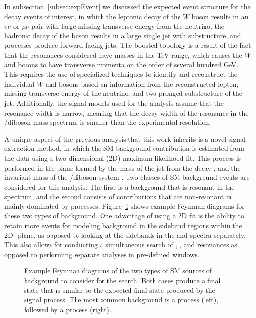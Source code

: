 In subsection~\ref{subsec:expEvent} we discussed the expected event structure for the decay events of interest, in which the leptonic decay of the $W$ boson results in an $e\nu$ or $\mu\nu$ pair with large missing transverse energy from the neutrino, the hadronic decay of the \VorH boson results in a large single jet with substructure, and \VBF processes produce forward-facing jets.
The boosted topology is a result of the fact that the resonances considered have masses in the TeV range, which causes the $W$ and \VorH bosons to have transverse momenta on the order of several hundred GeV.
This requires the use of specialized techniques to identify and reconstruct the individual $W$ and \VorH bosons based on information from the reconstructed lepton, missing transverse energy of the neutrino, and two-pronged substructure of the jet.
Additionally, the signal models used for the analysis assume that the resonance width is narrow, meaning that the decay width of the resonance in the \WV/\WH diboson mass spectrum is smaller than the experimental resolution.

A unique aspect of the previous analysis that this work inherits is a novel signal extraction method, in which the SM background contribution is estimated from the data using a two-dimensional (2D) maximum likelihood fit.
This process is performed in the plane formed by the mass of the jet from the \VorH decay \MJ, and the invariant mass of the \WV/\WH diboson system \MVV.
Two classes of SM background events are considered for this analysis.
The first is a \WVt background that is resonant in the \MJ spectrum, and the second consists of contributions that are non-resonant in \MJ mainly dominated by \Wjets processes.
Figure~\ref{fig:bkgFeynman} shows example Feynman diagrams for these two types of background.
One advantage of using a 2D fit is the ability to retain more events for modeling background in the sideband regions within the 2D \MJ-\MVV plane, as opposed to looking at the sidebands in the \MJ and \MVV spectra separately.
This also allows for conducting a simultaneous search of \WW, \WZ, and \WH resonances as opposed to performing separate analyses in pre-defined \MJ windows.

\begin{figure}[htbp]
  \centering
  
  \caption{
    Example Feynman diagrams of the two types of SM sources of background to consider for the search.
    Both cases produce a final state that is similar to the expected final state produced by the \VBF signal process.
    The most common background is a \Wjets process (left), followed by a \WVt process (right).
  }
  \label{fig:bkgFeynman}
\end{figure}

